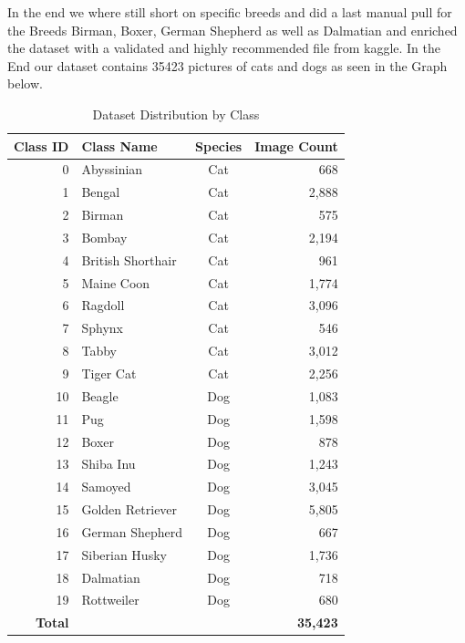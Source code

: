 In the end we where still short on specific breeds and did a last manual pull for the Breeds Birman, Boxer, German Shepherd as well as Dalmatian and enriched the
dataset with a validated and highly recommended file from kaggle. 
In the End our dataset contains 35423 pictures of cats and dogs as seen in the Graph below. 

\begin{table}[htbp]
\centering
\caption{Dataset Distribution by Class}
\label{tab:dataset_distribution}
\begin{tabular}{r l c r}
\hline
\textbf{Class ID} & \textbf{Class Name} & \textbf{Species} & \textbf{Image Count} \\
\hline
0  & Abyssinian         & Cat & 668 \\
1  & Bengal             & Cat & 2,888 \\
2  & Birman             & Cat & 575 \\
3  & Bombay             & Cat & 2,194 \\
4  & British Shorthair  & Cat & 961 \\
5  & Maine Coon         & Cat & 1,774 \\
6  & Ragdoll            & Cat & 3,096 \\
7  & Sphynx             & Cat & 546 \\
8  & Tabby              & Cat & 3,012 \\
9  & Tiger Cat          & Cat & 2,256 \\
\hline
10 & Beagle             & Dog & 1,083 \\
11 & Pug                & Dog & 1,598 \\
12 & Boxer              & Dog & 878 \\
13 & Shiba Inu          & Dog & 1,243 \\
14 & Samoyed            & Dog & 3,045 \\
15 & Golden Retriever   & Dog & 5,805 \\
16 & German Shepherd    & Dog & 667 \\
17 & Siberian Husky     & Dog & 1,736 \\
18 & Dalmatian          & Dog & 718 \\
19 & Rottweiler         & Dog & 680 \\
\hline
\textbf{Total} & & & \textbf{35,423} \\
\hline
\end{tabular}
\end{table}